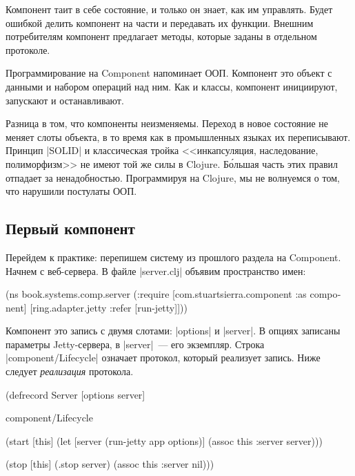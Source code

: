 Компонент таит в себе состояние, и только он знает, как им управлять. Будет
ошибкой делить компонент на части и передавать их функции. Внешним потребителям
компонент предлагает методы, которые заданы в отдельном протоколе.

Программирование на Component напоминает ООП. Компонент это объект с данными и
набором операций над ним. Как и классы, компонент инициируют, запускают и
останавливают.

Разница в том, что компоненты неизменяемы. Переход в новое состояние не меняет
слоты объекта, в то время как в промышленных языках их переписывают. Принцип
\spverb|SOLID| и классическая тройка <<инкапсуляция, наследование, полиморфизм>>
не имеют той же силы в Clojure. Б\'{о}льшая часть этих правил отпадает за
ненадобностью. Программируя на Clojure, мы не волнуемся о том, что нарушили
постулаты ООП.

\subsection{Первый компонент}

Перейдем к практике: перепишем систему из прошлого раздела на Component. Начнем
с веб-сервера. В файле \spverb|server.clj| объявим пространство имен:

\begin{english}
  \begin{clojure}
(ns book.systems.comp.server
  (:require
   [com.stuartsierra.component :as component]
   [ring.adapter.jetty :refer [run-jetty]]))
  \end{clojure}
\end{english}

Компонент это запись с двумя слотами: \spverb|options| и \spverb|server|. В
опциях записаны параметры Jetty-сервера, в \spverb|server|~--- его
экземпляр. Строка \spverb|component/Lifecycle| означает протокол, который
реализует запись. Ниже следует \emph{реализация} протокола.

\begin{english}
  \begin{clojure}
(defrecord Server [options server]

  component/Lifecycle

  (start [this]
    (let [server (run-jetty app options)]
      (assoc this :server server)))

  (stop [this]
    (.stop server)
    (assoc this :server nil)))
  \end{clojure}
\end{english}

